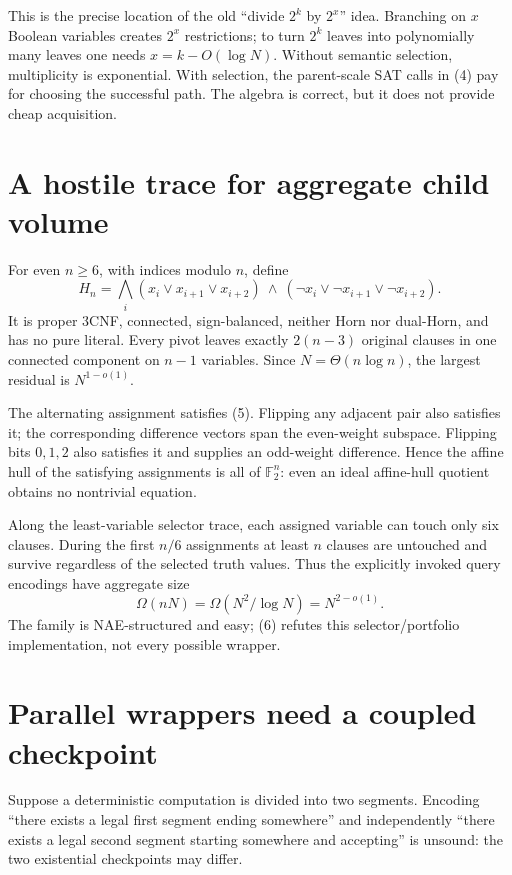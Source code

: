 \documentclass[11pt]{article}
\begin{document}
This is the precise location of the old ``divide $2^k$ by $2^x$'' idea.
Branching on $x$ Boolean variables creates $2^x$ restrictions; to turn
$2^k$ leaves into polynomially many leaves one needs $x=k-O(\log N)$.
Without semantic selection, multiplicity is exponential.  With selection,
the parent-scale SAT calls in (4) pay for choosing the successful path.  The
algebra is correct, but it does not provide cheap acquisition.

\section{A hostile trace for aggregate child volume}
For even $n\ge6$, with indices modulo $n$, define
\begin{equation}
 H_n=\bigwedge_i(x_i\vee x_{i+1}\vee x_{i+2})\ \wedge\
               (\neg x_i\vee\neg x_{i+1}\vee\neg x_{i+2}).          \tag{5}
\end{equation}
It is proper 3CNF, connected, sign-balanced, neither Horn nor dual-Horn,
and has no pure literal.  Every pivot leaves exactly $2(n-3)$ original
clauses in one connected component on $n-1$ variables.  Since
$N=\Theta(n\log n)$, the largest residual is $N^{1-o(1)}$.

The alternating assignment satisfies (5).  Flipping any adjacent pair also
satisfies it; the corresponding difference vectors span the even-weight
subspace.  Flipping bits $0,1,2$ also satisfies it and supplies an odd-weight
difference.  Hence the affine hull of the satisfying assignments is all of
$\mathbb F_2^n$: even an ideal affine-hull quotient obtains no nontrivial
equation.

Along the least-variable selector trace, each assigned variable can touch
only six clauses.  During the first $n/6$ assignments at least $n$ clauses
are untouched and survive regardless of the selected truth values.  Thus
the explicitly invoked query encodings have aggregate size
\begin{equation}
 \Omega(nN)=\Omega(N^2/\log N)=N^{2-o(1)}.              \tag{6}
\end{equation}
The family is NAE-structured and easy; (6) refutes this selector/portfolio
implementation, not every possible wrapper.

\section{Parallel wrappers need a coupled checkpoint}
Suppose a deterministic computation is divided into two segments.  Encoding
``there exists a legal first segment ending somewhere'' and independently
``there exists a legal second segment starting somewhere and accepting'' is
unsound: the two existential checkpoints may differ.
\end{document}
